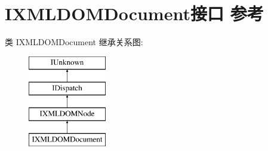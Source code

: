 \hypertarget{interface_i_x_m_l_d_o_m_document}{}\section{I\+X\+M\+L\+D\+O\+M\+Document接口 参考}
\label{interface_i_x_m_l_d_o_m_document}
类 I\+X\+M\+L\+D\+O\+M\+Document 继承关系图\+:\begin{figure}[H]
\begin{center}
\leavevmode
\includegraphics[height=4.000000cm]{interface_i_x_m_l_d_o_m_document}
\end{center}
\end{figure}
